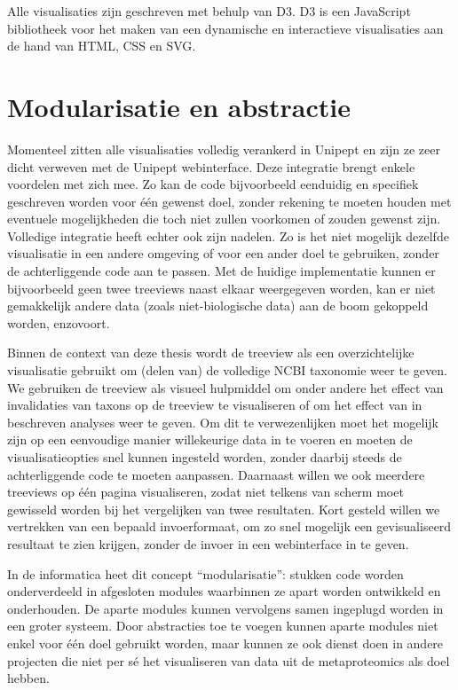 Alle visualisaties zijn geschreven met behulp van D3. D3 is een JavaScript
bibliotheek voor het maken van een dynamische en
interactieve visualisaties aan de hand van HTML, CSS en SVG\cite{D3.js6:online}.

\section{Modularisatie en abstractie} 
\label{sec:modenabs} 

Momenteel zitten alle visualisaties volledig verankerd in Unipept en zijn ze
zeer dicht verweven met de Unipept webinterface. Deze integratie brengt enkele
voordelen met zich mee. Zo kan de code bijvoorbeeld eenduidig en specifiek
geschreven worden voor één gewenst doel, zonder rekening te moeten houden met
eventuele mogelijkheden die toch niet zullen voorkomen of zouden gewenst zijn.
Volledige integratie heeft echter ook zijn nadelen. Zo is het niet mogelijk
dezelfde visualisatie in een andere omgeving of voor een ander doel te
gebruiken, zonder de achterliggende code aan te passen. Met de huidige
implementatie kunnen er bijvoorbeeld geen twee treeviews naast elkaar 
weergegeven worden, kan er niet gemakkelijk andere data (zoals niet-biologische 
data) aan de boom gekoppeld worden, enzovoort.

Binnen de context van deze thesis wordt de treeview als een overzichtelijke
visualisatie gebruikt om (delen van) de volledige NCBI taxonomie weer te geven.
We gebruiken de treeview als visueel hulpmiddel om onder andere het effect van
invalidaties van taxons op de treeview te visualiseren of om het effect van in
 beschreven analyses weer te geven. Om dit te verwezenlijken moet
het mogelijk zijn op een eenvoudige manier willekeurige data in te voeren en
moeten de visualisatieopties snel kunnen ingesteld worden, zonder daarbij steeds
de achterliggende code te moeten aanpassen. Daarnaast willen we ook meerdere
treeviews op één pagina visualiseren, zodat niet telkens van scherm moet
gewisseld worden bij het vergelijken van twee resultaten. Kort gesteld willen we
vertrekken van een bepaald invoerformaat, om zo snel mogelijk een gevisualiseerd
resultaat te zien krijgen, zonder de invoer in een webinterface in te geven.

In de informatica heet dit concept ``modularisatie'': stukken code worden
onderverdeeld in afgesloten modules waarbinnen ze apart worden ontwikkeld en
onderhouden. De aparte modules kunnen vervolgens samen ingeplugd worden in een
groter systeem. Door abstracties toe te voegen kunnen aparte modules niet enkel
voor één doel gebruikt worden, maar kunnen ze ook dienst doen in andere
projecten die niet per sé het visualiseren van data uit de metaproteomics als
doel hebben.

